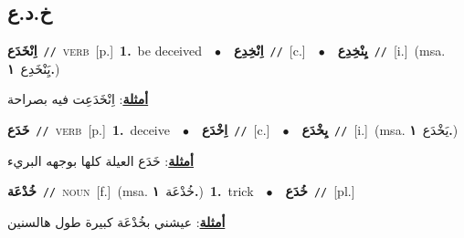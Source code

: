 \documentclass[10pt,a4paper,twoside]{article} %
\begin{document}
\begin{multicols}{2}
\vspace{-3mm}
\subsection*{\color{blue}\foreignlanguage{arabic}{خ.د.ع}\color{blue}{}} 

{\setlength\topsep{0pt}\textbf{\foreignlanguage{arabic}{اِنْخَدَع}}\ {\color{gray}\texttt{//}\color{black}}\ \textsc{verb}\ [p.]\ \textbf{1.}~be deceived\ \ $\bullet$\ \ \setlength\topsep{0pt}\textbf{\foreignlanguage{arabic}{اِنْخِدِع}}\ {\color{gray}\texttt{//}\color{black}}\ [c.]\ \ $\bullet$\ \ \setlength\topsep{0pt}\textbf{\foreignlanguage{arabic}{يِنْخِدِع}}\ {\color{gray}\texttt{//}\color{black}}\ [i.]\ \color{gray}(msa. \foreignlanguage{arabic}{يَِنْخَدِع}~\foreignlanguage{arabic}{\textbf{١.}})\color{black}\  \begin{flushright}\color{gray}\foreignlanguage{arabic}{\textbf{\underline{\foreignlanguage{arabic}{أمثلة}}}: اِنْخَدَعِت فيه بصراحة}\end{flushright}\color{black}} \vspace{2mm}

{\setlength\topsep{0pt}\textbf{\foreignlanguage{arabic}{خَدَع}}\ {\color{gray}\texttt{//}\color{black}}\ \textsc{verb}\ [p.]\ \textbf{1.}~deceive\ \ $\bullet$\ \ \setlength\topsep{0pt}\textbf{\foreignlanguage{arabic}{اِخْدَع}}\ {\color{gray}\texttt{//}\color{black}}\ [c.]\ \ $\bullet$\ \ \setlength\topsep{0pt}\textbf{\foreignlanguage{arabic}{يِخْدَع}}\ {\color{gray}\texttt{//}\color{black}}\ [i.]\ \color{gray}(msa. \foreignlanguage{arabic}{يَخْدَع}~\foreignlanguage{arabic}{\textbf{١.}})\color{black}\  \begin{flushright}\color{gray}\foreignlanguage{arabic}{\textbf{\underline{\foreignlanguage{arabic}{أمثلة}}}: خَدَع العيلة كلها بوجهه البريء}\end{flushright}\color{black}} \vspace{2mm}

{\setlength\topsep{0pt}\textbf{\foreignlanguage{arabic}{خُدْعَة}}\ {\color{gray}\texttt{//}\color{black}}\ \textsc{noun}\ [f.]\ \color{gray}(msa. \foreignlanguage{arabic}{خُدْعَة}~\foreignlanguage{arabic}{\textbf{١.}})\color{black}\ \textbf{1.}~trick\ \ $\bullet$\ \ \setlength\topsep{0pt}\textbf{\foreignlanguage{arabic}{خُدَع}}\ {\color{gray}\texttt{//}\color{black}}\ [pl.]\  \begin{flushright}\color{gray}\foreignlanguage{arabic}{\textbf{\underline{\foreignlanguage{arabic}{أمثلة}}}: عيشني بخُدْعَة كبيرة طول هالسنين}\end{flushright}\color{black}} \vspace{2mm}


\end{multicols}
\end{document}
